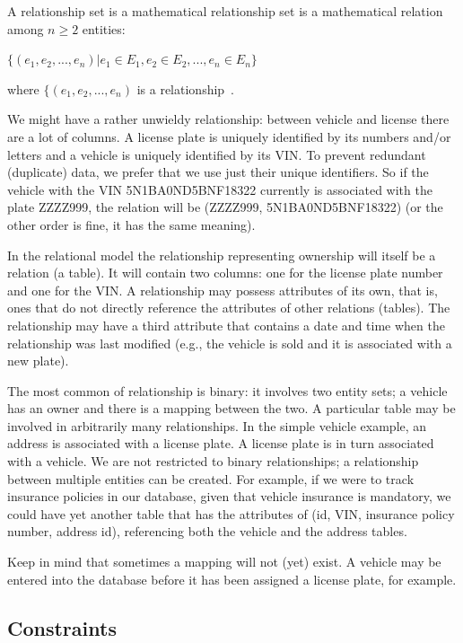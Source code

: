 A relationship set is a mathematical relationship set is a mathematical relation among $n \geq 2$ entities:

\begin{center}
 $\{(e_{1}, e_{2}, ..., e_{n}) | e_{1} \in E_{1}, e_{2} \in E_{2}, ..., e_{n} \in E_{n}\}$
\end{center}

where $\{(e_{1}, e_{2}, ..., e_{n})$ is a relationship~\cite{dsc}. 

We might have a rather unwieldy relationship: between vehicle and license there are a lot of columns. A license plate is uniquely identified by its numbers and/or letters and a vehicle is uniquely identified by its VIN. To prevent redundant (duplicate) data, we prefer that we use just their unique identifiers. So if the vehicle with the VIN 5N1BA0ND5BNF18322 currently is associated with the plate ZZZZ999, the relation will be (ZZZZ999, 5N1BA0ND5BNF18322) (or the other order is fine, it has the same meaning).

In the relational model the relationship representing ownership will itself be a relation (a table). It will contain two columns: one for the license plate number and one for the VIN. A relationship may possess attributes of its own, that is, ones that do not directly reference the attributes of other relations (tables). The relationship may have a third attribute that contains a date and time when the relationship was last modified (e.g., the vehicle is sold and it is associated with a new plate).

The most common of relationship is binary: it involves two entity sets; a vehicle has an owner and there is a mapping between the two. A particular table may be involved in arbitrarily many relationships. In the simple vehicle example, an address is associated with a license plate. A license plate is in turn associated with a vehicle. We are not restricted to binary relationships; a relationship between multiple entities can be created. For example, if we were to track insurance policies in our database, given that vehicle insurance is mandatory, we could have yet another table that has the attributes of (id, VIN, insurance policy number, address id), referencing both the vehicle and the address tables. 

Keep in mind that sometimes a mapping will not (yet) exist. A vehicle may be entered into the database before it has been assigned a license plate, for example. 

\subsection*{Constraints}

